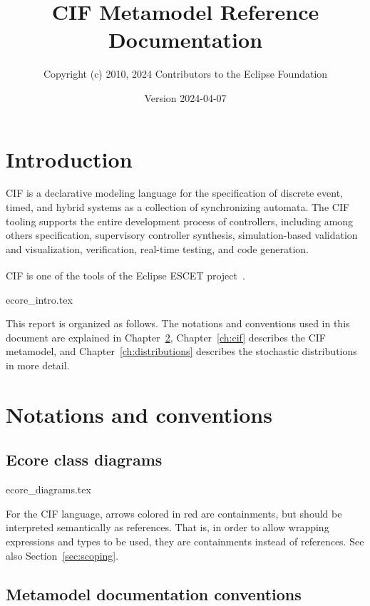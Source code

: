 \documentclass{report}
\title{CIF Metamodel Reference Documentation}
\author{Copyright (c) 2010, 2024 Contributors to the Eclipse Foundation}
\date{Version 2024-04-07}
\begin{document}
\maketitle
\tableofcontents

\chapter{Introduction}
CIF is a declarative modeling language for the specification of discrete
event, timed, and hybrid systems as a collection of synchronizing automata.
The CIF tooling supports the entire development process of controllers,
including among others specification, supervisory controller synthesis,
simulation-based validation and visualization, verification, real-time
testing, and code generation.

CIF is one of the tools of the Eclipse ESCET\textsuperscript{\texttrademark{}}
project~\cite{Eclipse:ESCET}.


       {ecore_intro.tex}

This report is organized as follows. The notations and conventions used in
this document are explained in Chapter~\ref{ch:notations-conventions},
Chapter~\ref{ch:cif} describes the CIF metamodel, and
Chapter~\ref{ch:distributions} describes the stochastic distributions in more
detail.


\chapter{Notations and conventions}\label{ch:notations-conventions}

\section{Ecore class diagrams}


       {ecore_diagrams.tex}

For the CIF language, arrows colored in red are containments, but should
be interpreted semantically as references. That is, in order to allow
wrapping expressions and types to be used, they are containments instead of
references. See also Section~\ref{sec:scoping}.


\section{Metamodel documentation conventions}
\end{document}

